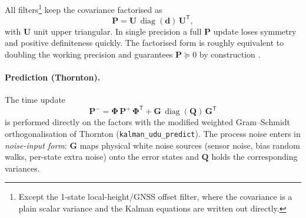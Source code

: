 \documentclass[11pt,a4paper]{article}
\newcommand{\vect}[1]{\bm{#1}}
\newcommand{\mat}[1]{\bm{#1}}
\newcommand{\T}{^{\mathsf{T}}}
\newcommand{\diag}{\operatorname{diag}}
\newcommand{\code}[1]{\texttt{#1}}
\begin{document}
All filters\footnote{Except the 1-state local-height/GNSS offset filter, where
the covariance is a plain scalar variance and the Kalman equations are
written out directly.} keep the covariance factorised as
\begin{equation}
  \mat{P} = \mat{U}\,\diag(\vect{d})\,\mat{U}\T ,
\end{equation}
with $\mat{U}$ unit upper triangular. In single precision a full
$\mat{P}$ update loses symmetry and positive definiteness quickly. The
factorised form is roughly equivalent to doubling the working precision
and guarantees $\mat{P} \succeq 0$ by construction
\cite{bierman1977,grewal2015,carpenter2018}.

\paragraph{Prediction (Thornton).}
The time update
\begin{equation}
  \mat{P}^- = \mat{\Phi}\,\mat{P}^+\,\mat{\Phi}\T
            + \mat{G}\,\diag(\vect{Q})\,\mat{G}\T
  \label{eq:thornton}
\end{equation}
is performed directly on the factors with the modified weighted Gram--Schmidt
orthogonalisation of Thornton (\code{kalman\_\allowbreak{}udu\_\allowbreak{}predict}).
The process noise enters in \emph{noise-input form}: $\mat{G}$ maps physical
white noise sources (sensor noise, bias random walks, per-state extra noise)
onto the error states and $\vect{Q}$ holds the corresponding
variances.
\end{document}
